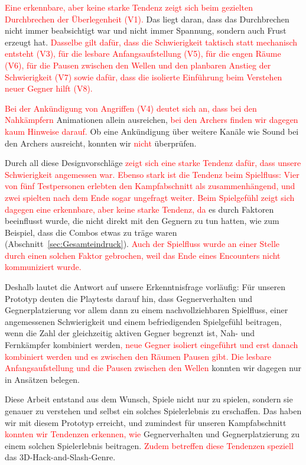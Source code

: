 \documentclass[../Main.tex]{subfiles}
\begin{document}
\textcolor{red}{Eine erkennbare, aber keine starke Tendenz zeigt sich beim gezielten Durchbrechen der Überlegenheit (V1).} Das liegt daran, dass das Durchbrechen nicht immer beabsichtigt war und nicht immer Spannung, sondern auch Frust erzeugt hat. \textcolor{red}{Dasselbe gilt dafür, dass die Schwierigkeit taktisch statt mechanisch entsteht (V3), für die lesbare Anfangsaufstellung (V5), für die engen Räume (V6), für die Pausen zwischen den Wellen und den planbaren Anstieg der Schwierigkeit (V7) sowie dafür, dass die isolierte Einführung beim Verstehen neuer Gegner hilft (V8).}

\textcolor{red}{Bei der Ankündigung von Angriffen (V4) deutet sich an, dass bei den Nahkämpfern} Animationen allein ausreichen, \textcolor{red}{bei den Archers finden wir dagegen kaum Hinweise darauf.} Ob eine Ankündigung über weitere Kanäle wie Sound bei den Archers ausreicht, konnten wir \textcolor{red}{nicht} überprüfen.

Durch all diese Designvorschläge \textcolor{red}{zeigt sich eine starke Tendenz dafür, dass unsere Schwierigkeit angemessen war. Ebenso stark ist die Tendenz beim Spielfluss: Vier von fünf Testpersonen erlebten den Kampfabschnitt als zusammenhängend, und zwei spielten nach dem Ende sogar ungefragt weiter. Beim Spielgefühl zeigt sich dagegen eine erkennbare, aber keine starke Tendenz, da} es durch Faktoren beeinflusst wurde, die nicht direkt mit den Gegnern zu tun hatten, wie zum Beispiel, dass die Combos etwas zu träge waren (Abschnitt~\ref{sec:Gesamteindruck}). \textcolor{red}{Auch der Spielfluss wurde an einer Stelle durch einen solchen Faktor gebrochen, weil das Ende eines Encounters nicht kommuniziert wurde.}

Deshalb lautet die Antwort auf unsere Erkenntnisfrage vorläufig: Für unseren Prototyp deuten die Playtests darauf hin, dass Gegnerverhalten und Gegnerplatzierung vor allem dann zu einem nachvollziehbaren Spielfluss, einer angemessenen Schwierigkeit und einem befriedigenden Spielgefühl beitragen, wenn die Zahl der gleichzeitig aktiven Gegner begrenzt ist, Nah- und Fernkämpfer kombiniert werden\textcolor{red}{, neue Gegner isoliert eingeführt und erst danach kombiniert werden und es zwischen den Räumen Pausen gibt. Die lesbare Anfangsaufstellung und die Pausen zwischen den Wellen} konnten wir dagegen nur in Ansätzen belegen.

Diese Arbeit entstand aus dem Wunsch, Spiele nicht nur zu spielen, sondern sie genauer zu verstehen und selbst ein solches Spielerlebnis zu erschaffen. Das haben wir mit diesem Prototyp erreicht, und zumindest für unseren Kampfabschnitt \textcolor{red}{konnten wir Tendenzen erkennen, wie} Gegnerverhalten und Gegnerplatzierung zu einem solchen Spielerlebnis beitragen. \textcolor{red}{Zudem betreffen diese Tendenzen speziell} das 3D-Hack-and-Slash-Genre.
\end{document}
